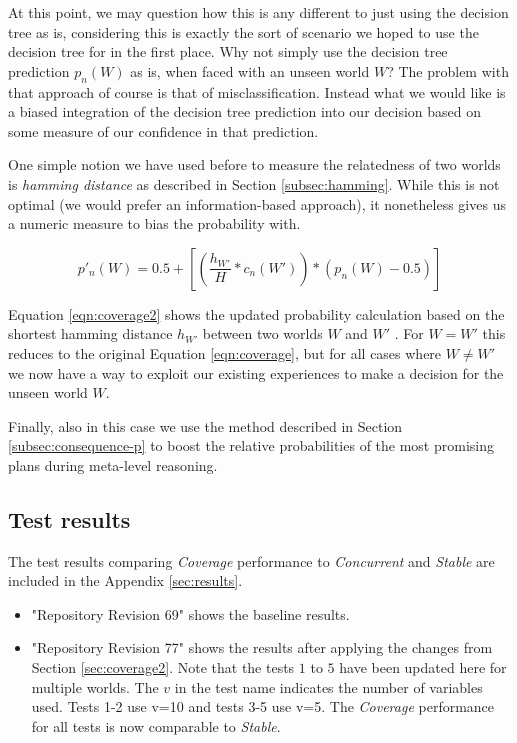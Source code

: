 \documentclass[a4paper]{article}
\newcommand{\cc}{\emph{Concurrent}\xspace}
\newcommand{\st}{\emph{Stable}\xspace}
\newcommand{\cov}{\emph{Coverage}\xspace}
\newcommand{\dt}{{decision tree}\xspace}
\begin{document}
At this point, we may question how this is any different to just using the \dt as is, considering this is exactly the sort of scenario we hoped to use the decision tree for in the first place. Why not simply use the \dt prediction $p_n(W)$ as is, when faced with an unseen world $W$? The problem with that approach of course is that of misclassification. Instead what we would like is a biased integration of the \dt prediction into our decision based on some measure of our confidence in that prediction.

One simple notion we have used before to measure the relatedness of two worlds is \textit{hamming distance} as described in Section \ref{subsec:hamming}. While this is not optimal (we would prefer an information-based approach), it nonetheless gives us a numeric measure to bias the probability with.


\begin{equation}
\label{eqn:coverage2}   
p'_n(W)= 0.5 + \left[  \left( \frac{h_{W'}}{H} * c_n(W') \right) *  \left( p_n(W) - 0.5 \right)  \right]
\end{equation}

Equation \ref{eqn:coverage2} shows the updated probability calculation based on the shortest hamming distance $h_{W'}$ between two worlds $W$ and $W'$ . For $W = W'$ this reduces to the original Equation \ref{eqn:coverage}, but for all cases where $W \ne W'$ we now have a way to exploit our existing experiences to make a decision for the unseen world $W$. 

Finally, also in this case we use the method described in Section \ref{subsec:consequence-p} to boost the relative probabilities of the most promising plans during meta-level reasoning.

\subsection{Test results}

The test results comparing \cov performance to \cc and \st are included in the Appendix \ref{sec:results}.
\begin{itemize}
\item "Repository Revision 69" shows the baseline results.
\item "Repository Revision 77" shows the results after applying the changes from Section \ref{sec:coverage2}. Note that the tests $1$ to $5$ have been updated here for multiple worlds. The $v$ in the test name indicates the number of variables used. Tests 1-2 use v=10 and tests 3-5 use v=5. The \cov performance for all tests is now comparable to \st. 
\end{itemize}
\end{document}
